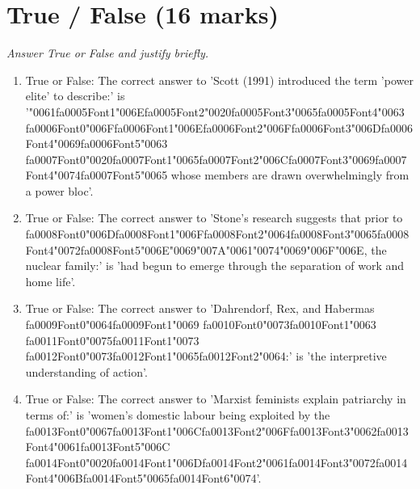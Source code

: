 \documentclass[12pt]{article}
\begin{document}
\section*{True / False (16 marks)}
\textit{Answer True or False and justify briefly.}
\begin{enumerate}[label=\arabic*.]
\item True or False: The correct answer to 'Scott (1991) introduced the term 'power elite' to describe:' is '{\char"0061}{\csname fa0005Font1\endcsname\char"006E}{\csname fa0005Font2\endcsname\char"0020}{\csname fa0005Font3\endcsname\char"0065}{\csname fa0005Font4\endcsname\char"0063} {\csname fa0006Font0\endcsname\char"006F}{\csname fa0006Font1\endcsname\char"006E}{\csname fa0006Font2\endcsname\char"006F}{\csname fa0006Font3\endcsname\char"006D}{\csname fa0006Font4\endcsname\char"0069}{\csname fa0006Font5\endcsname\char"0063} {\csname fa0007Font0\endcsname\char"0020}{\csname fa0007Font1\endcsname\char"0065}{\csname fa0007Font2\endcsname\char"006C}{\csname fa0007Font3\endcsname\char"0069}{\csname fa0007Font4\endcsname\char"0074}{\csname fa0007Font5\endcsname\char"0065} whose members are drawn overwhelmingly from a power bloc'.
\item True or False: The correct answer to 'Stone's research suggests that prior to {\csname fa0008Font0\endcsname\char"006D}{\csname fa0008Font1\endcsname\char"006F}{\csname fa0008Font2\endcsname\char"0064}{\csname fa0008Font3\endcsname\char"0065}{\csname fa0008Font4\endcsname\char"0072}{\csname fa0008Font5\endcsname\char"006E}{\char"0069}{\char"007A}{\char"0061}{\char"0074}{\char"0069}{\char"006F}{\char"006E}, the nuclear family:' is 'had begun to emerge through the separation of work and home life'.
\item True or False: The correct answer to 'Dahrendorf, Rex, and Habermas {\csname fa0009Font0\endcsname\char"0064}{\csname fa0009Font1\endcsname\char"0069} {\csname fa0010Font0\endcsname\char"0073}{\csname fa0010Font1\endcsname\char"0063} {\csname fa0011Font0\endcsname\char"0075}{\csname fa0011Font1\endcsname\char"0073} {\csname fa0012Font0\endcsname\char"0073}{\csname fa0012Font1\endcsname\char"0065}{\csname fa0012Font2\endcsname\char"0064}:' is 'the interpretive understanding of action'.
\item True or False: The correct answer to 'Marxist feminists explain patriarchy in terms of:' is 'women's domestic labour being exploited by the {\csname fa0013Font0\endcsname\char"0067}{\csname fa0013Font1\endcsname\char"006C}{\csname fa0013Font2\endcsname\char"006F}{\csname fa0013Font3\endcsname\char"0062}{\csname fa0013Font4\endcsname\char"0061}{\csname fa0013Font5\endcsname\char"006C} {\csname fa0014Font0\endcsname\char"0020}{\csname fa0014Font1\endcsname\char"006D}{\csname fa0014Font2\endcsname\char"0061}{\csname fa0014Font3\endcsname\char"0072}{\csname fa0014Font4\endcsname\char"006B}{\csname fa0014Font5\endcsname\char"0065}{\csname fa0014Font6\endcsname\char"0074}'.

\end{enumerate}
\end{document}
